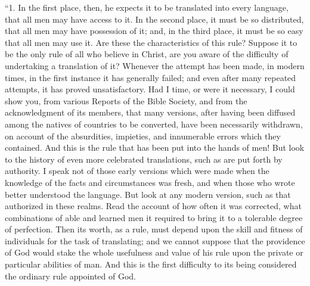 ``1.
In the first place, then, he expects it to be translated into every
language, that all men may have access to it. In the second place, it
must be so distributed, that all men may have possession of it; and, in
the third place, it must be so easy that all men may use it. Are these
the characteristics of this rule? Suppose it to be the only rule of all
who believe in Christ, are you aware of the difficulty of undertaking a
translation of it? Whenever the attempt has been made, in modern times,
in the first instance it has generally failed; and even after many
repeated attempts, it has proved unsatisfactory. Had I time, or were it
necessary, I could show you, from various Reports of the Bible Society,
and from the acknowledgment of its members, that many versions, after
having been diffused among the natives of countries to be converted,
have been necessarily withdrawn, on account of the absurdities,
impieties, and innumerable errors which they contained. And this is the
rule that has been put into the hands of men! But look to the history of
even more celebrated translations, such as are put forth by authority. I
speak not of those early versions which were made when the knowledge of
the facts and circumstances was fresh, and when those who wrote better
understood the language. But look at any modern version, such as that
authorized in these realms. Read the account of how often it was
corrected, what combinations of able and learned men it required to
bring it to a tolerable degree of perfection. Then its worth, as a rule,
must depend upon the skill and fitness of individuals for the task of
translating; and we cannot suppose that the providence of God would
stake the whole usefulness and value of his rule upon the private or
particular abilities of man. And this is the first difficulty to its
being considered the ordinary rule appointed of God.

